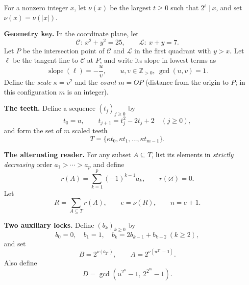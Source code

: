 
\Problem
\begingroup\footnotesize

For a nonzero integer \(x\), let \(\nu(x)\) be the largest \(t\ge 0\) such that \(2^t\mid x\), and set \(\nu(x)=\nu(|x|)\).

\smallskip
\noindent\textbf{Geometry key.}
In the coordinate plane, let
\[
\mathcal C:\ x^2+y^2=25,\qquad \mathcal L:\ x+y=7.
\]
Let \(P\) be the intersection point of \(\mathcal C\) and \(\mathcal L\) in the first quadrant with \(y>x\).
Let \(\ell\) be the tangent line to \(\mathcal C\) at \(P\), and write its slope in lowest terms as
\[
\operatorname{slope}(\ell)=-\frac{u}{v},\qquad u,v\in\mathbb Z_{>0},\ \gcd(u,v)=1.
\]
Define the \emph{scale} \(\kappa=v^2\) and the \emph{count} \(m=OP\) (distance from the origin to \(P\); in this configuration \(m\) is an integer).

\smallskip
\noindent\textbf{The teeth.}
Define a sequence \((t_j)_{j\ge 0}\) by
\[
t_0=u,\qquad t_{j+1}=t_j^2-2t_j+2\quad (j\ge 0),
\]
and form the set of \(m\) scaled teeth
\[
T=\{\kappa t_0,\kappa t_1,\dots,\kappa t_{m-1}\}.
\]

\smallskip
\noindent\textbf{The alternating reader.}
For any subset \(A\subseteq T\), list its elements in \emph{strictly decreasing} order \(a_1>\cdots>a_p\) and define
\[
r(A)=\sum_{k=1}^{p}(-1)^{k-1}a_k,\qquad r(\varnothing)=0.
\]
Let
\[
R=\sum_{A\subseteq T} r(A),\qquad e=\nu(R),\qquad n=e+1.
\]

\smallskip
\noindent\textbf{Two auxiliary locks.}
Define \((b_k)_{k\ge 0}\) by
\[
b_0=0,\quad b_1=1,\quad b_k=2b_{k-1}+b_{k-2}\ (k\ge 2),
\]
and set
\[
B=2^{\nu(b_{2^n})},\qquad A=2^{\nu(u^{2^n}-1)}.
\]
Also define
\[
D=\gcd\!\left(u^{2^n}-1,\ 2^{2^m}-1\right).
\]

